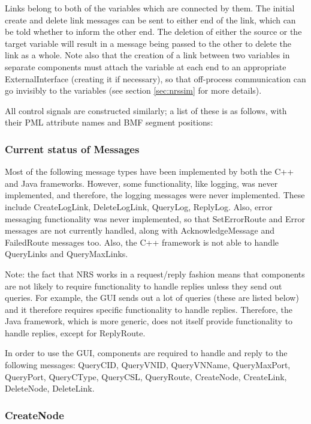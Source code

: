 \documentclass[pdftex,a4paper]{article}
\begin{document}
Links belong to both of the variables which are connected by them. The
initial create and delete link messages can be sent to either end of
the link, which can be told whether to inform the other end. The
deletion of either the source or the target variable will result in a
message being passed to the other to delete the link as a whole. Note
also that the creation of a link between two variables in separate
components must attach the variable at each end to an appropriate
ExternalInterface (creating it if necessary), so that off-process
communication can go invisibly to the variables (see section
\ref{sec:nrssim} for more details).

All control signals are constructed similarly; a list of these is as
follows, with their PML attribute names and BMF segment positions:

\subsubsection{Current status of Messages}
Most of the following message types have been implemented by both the C++ and
Java frameworks. However, some functionality, like logging, was never implemented, and
therefore, the logging messages were never implemented. These include
CreateLogLink, DeleteLogLink, QueryLog, ReplyLog. Also, error messaging
functionality was never implemented, so that SetErrorRoute and
Error messages are not currently handled, along with AcknowledgeMessage and
FailedRoute messages too. Also, the C++ framework is not able to handle
QueryLinks and QueryMaxLinks.

Note: the fact that NRS works in a request/reply fashion means that
components are not likely to require functionality to handle replies unless they
send out queries. For example, the GUI sends out a lot of queries (these are listed
below) and it therefore requires specific functionality to handle
replies. Therefore, the Java framework, which is more generic, does not itself
provide functionality to handle replies, except for ReplyRoute.

In order to use the GUI, components are required to handle and reply to the
following messages: QueryCID, QueryVNID, QueryVNName, QueryMaxPort, QueryPort,
QueryCType, QueryCSL, QueryRoute, CreateNode, CreateLink, DeleteNode,
DeleteLink.

\clearpage
\subsubsection{CreateNode}
\end{document}
